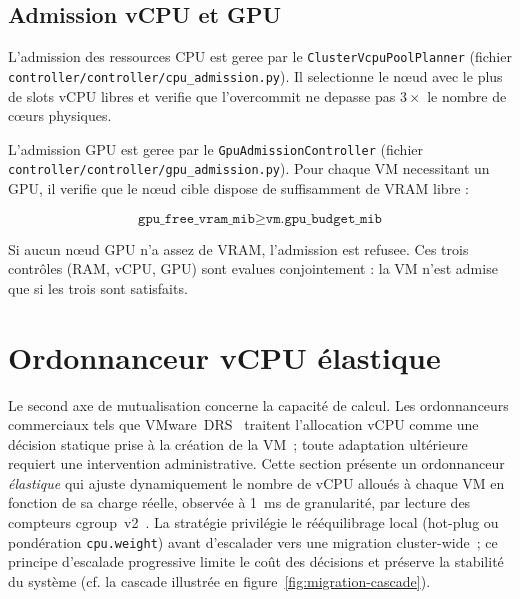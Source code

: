 \subsection{Admission vCPU et GPU}
\label{subsec:admission-cpu-gpu}

L'admission des ressources CPU est geree par le \texttt{ClusterVcpuPoolPlanner} (fichier \texttt{controller/controller/cpu\_admission.py}). Il selectionne le nœud avec le plus de slots vCPU libres et verifie que l'overcommit ne depasse pas $3\times$ le nombre de cœurs physiques.

L'admission GPU est geree par le \texttt{GpuAdmissionController} (fichier \texttt{controller/controller/gpu\_admission.py}). Pour chaque VM necessitant un GPU, il verifie que le nœud cible dispose de suffisamment de VRAM libre :

\begin{equation}
    \texttt{gpu\_free\_vram\_mib} \geq \texttt{vm.gpu\_budget\_mib}
\end{equation}

Si aucun nœud GPU n'a assez de VRAM, l'admission est refusee. Ces trois contrôles (RAM, vCPU, GPU) sont evalues conjointement : la VM n'est admise que si les trois sont satisfaits.

\section{Ordonnanceur vCPU élastique}
\label{sec:vcpu-scheduler}

Le second axe de mutualisation concerne la capacité de calcul. Les ordonnanceurs commerciaux tels que VMware~DRS~\cite{gulati_2012_drs} traitent l'allocation vCPU comme une décision statique prise à la création de la VM~; toute adaptation ultérieure requiert une intervention administrative. Cette section présente un ordonnanceur \emph{élastique} qui ajuste dynamiquement le nombre de vCPU alloués à chaque VM en fonction de sa charge réelle, observée à 1~ms de granularité, par lecture des compteurs cgroup~v2~\cite{cgroups_v2_doc}. La stratégie privilégie le rééquilibrage local (hot-plug ou pondération \texttt{cpu.weight}) avant d'escalader vers une migration cluster-wide~; ce principe d'escalade progressive limite le coût des décisions et préserve la stabilité du système (cf. la cascade illustrée en figure~\ref{fig:migration-cascade}).

